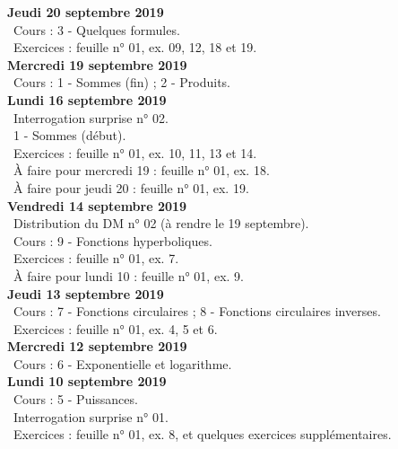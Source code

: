 \documentclass[12pt,a4paper]{article}
\begin{document}
 \noindent\textbf{Jeudi 20 septembre 2019}\\
 \bu\ Cours : 3 - Quelques formules.\\
 \bu\ Exercices : feuille n° 01, ex. 09, 12, 18 et 19.\vspace{.4cm}\\
 
 \noindent\textbf{\bf Mercredi 19 septembre 2019}\\
 \bu\ Cours : 1 - Sommes (fin) ; 2 - Produits.\vspace{.4cm}\\
 
 \noindent\textbf{\bf Lundi 16 septembre 2019}\\ 
 \bu\ Interrogation surprise n° 02.\\
 \bu\ 1 - Sommes (début).\\
 \bu\ Exercices : feuille n° 01, ex. 10, 11, 13 et 14.\\
 \bu\ À faire pour mercredi 19 : feuille n° 01, ex. 18.\\
 \bu\ À faire pour jeudi 20 : feuille n° 01, ex. 19.\vspace{.4cm}\\
 
 \noindent\textbf{Vendredi 14 septembre 2019}\\
 \bu\ Distribution du DM n° 02 (à rendre le 19 septembre).\\
 \bu\ Cours : 9 - Fonctions hyperboliques.\\
 \bu\ Exercices : feuille n° 01, ex. 7.\\
 \bu\ À faire pour lundi 10 : feuille n° 01, ex. 9.\vspace{.4cm}\\
 
 \noindent\textbf{\bf Jeudi 13 septembre 2019}\\
 \bu\ Cours : 7 - Fonctions circulaires ; 8 - Fonctions circulaires inverses.\\
 \bu\ Exercices : feuille n° 01, ex. 4, 5 et 6.\vspace{.4cm}\\
     
 \noindent\textbf{\bf Mercredi 12 septembre 2019}\\
 \bu\ Cours : 6 - Exponentielle et logarithme.\vspace{.4cm}\\
 
 \noindent\textbf{\bf Lundi 10 septembre 2019}\\
 \bu\ Cours : 5 - Puissances.\\
 \bu\ Interrogation surprise n° 01.\\
 \bu\ Exercices : feuille n° 01, ex. 8, et quelques exercices supplémentaires.\vspace{.4cm}\\
 
\end{document}
